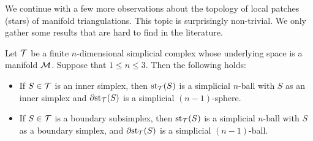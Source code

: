 \documentclass[10pt,a4paper]{article}
\begin{document}
We continue with a few more observations about the topology of local patches (stars) of manifold triangulations. 
This topic is surprisingly non-trivial. We only gather some results that are hard to find in the literature. 

\begin{lemma}\label{lemma:startopology}
    Let ${\mathcal T}$ be a finite $n$-dimensional simplicial complex whose underlying space is a manifold ${\mathcal M}$.
    Suppose that $1 \leq n \leq 3$. Then the following holds:
    \begin{itemize}
        \item
        If $S \in {\mathcal T}$ is an inner simplex, 
        then $\operatorname{st}_{{\mathcal T}}(S)$ is a simplicial $n$-ball with $S$ as an inner simplex
        and ${\partial \rm st}_{{\mathcal T}}(S)$ is a simplicial $(n-1)$-sphere. 
        \item
        If $S \in {\mathcal T}$ is a boundary subsimplex, 
        then $\operatorname{st}_{{\mathcal T}}(S)$ is a simplicial $n$-ball with $S$ as a boundary simplex,
        and ${\partial \rm st}_{{\mathcal T}}(S)$ is a simplicial $(n-1)$-ball. %
    \end{itemize}
\end{lemma}
\end{document}
